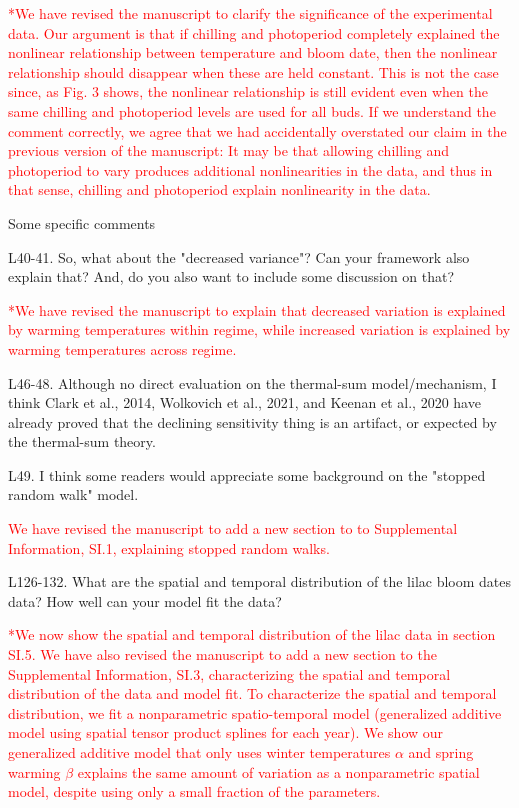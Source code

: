 \documentclass{article}
\begin{document}
\textcolor{red}{*We have revised the manuscript to clarify the significance of the experimental data. Our argument is that if chilling and photoperiod completely explained the nonlinear relationship between temperature and bloom date, then the nonlinear relationship should disappear when these are held constant. This is not the case since, as Fig. 3 shows, the nonlinear relationship is still evident even when the same chilling and photoperiod levels are used for all buds. If we understand the comment correctly, we agree that we had accidentally overstated our claim in the previous version of the manuscript: It may be that allowing chilling and photoperiod to vary produces additional nonlinearities in the data, and thus in that sense, chilling and photoperiod explain nonlinearity in the data.}


Some specific comments

L40-41. So, what about the "decreased variance"? Can your framework also explain that? And, do you also want to include some discussion on that?

\textcolor{red}{*We have revised the manuscript to explain that decreased variation is explained by warming temperatures within regime, while increased variation is explained by warming temperatures across regime.}

L46-48. Although no direct evaluation on the thermal-sum model/mechanism, I think Clark et al., 2014, Wolkovich et al., 2021, and Keenan et al., 2020 have already proved that the declining sensitivity thing is an artifact, or expected by the thermal-sum theory.

L49. I think some readers would appreciate some background on the "stopped random walk" model.

\textcolor{red}{We have revised the manuscript to add a new section to to Supplemental Information, SI.1, explaining stopped random walks.}

L126-132. What are the spatial and temporal distribution of the lilac bloom dates data? How well can your model fit the data?

\textcolor{red}{*We now show the spatial and temporal distribution of the lilac data in section SI.5. We have also revised the manuscript to add a new section to the Supplemental Information, SI.3, characterizing the spatial and temporal distribution of the data and model fit. To characterize the spatial and temporal distribution, we fit a nonparametric spatio-temporal model (generalized additive model using spatial tensor product splines for each year). We show our generalized additive model that only uses winter temperatures $\alpha$ and spring warming $\beta$ explains the same amount of variation as a nonparametric spatial model, despite using only a small fraction of the parameters.} %
\end{document}

